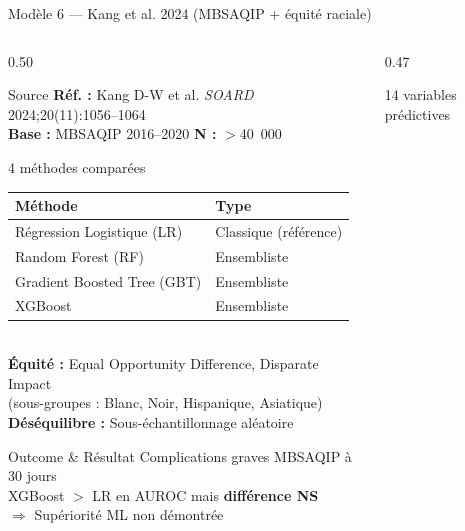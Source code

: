 \documentclass[aspectratio=169]{beamer}
\begin{document}
\begin{frame}[shrink=5]{Modèle 6 --- Kang et al. 2024 (MBSAQIP + équité raciale)}
  \begin{columns}[T]
    \begin{column}{0.50\textwidth}
      \begin{block}{Source}
        \footnotesize
        \textbf{Réf. :} Kang D-W et al. \textit{SOARD} 2024;20(11):1056--1064\\
        \textbf{Base :} MBSAQIP 2016--2020 \quad \textbf{N :} $>$40~000
      \end{block}
      \vspace{0.15em}
      \begin{block}{4 méthodes comparées}
        \footnotesize
        \begin{tabular}{ll}
          \toprule
          \textbf{Méthode} & \textbf{Type} \\
          \midrule
          Régression Logistique (LR) & Classique (référence) \\
          Random Forest (RF) & Ensembliste \\
          Gradient Boosted Tree (GBT) & Ensembliste \\
          XGBoost & Ensembliste \\
          \bottomrule
        \end{tabular}
        \vspace{3pt}\\
        \textbf{Équité :} Equal Opportunity Difference, Disparate Impact\\
        (sous-groupes : Blanc, Noir, Hispanique, Asiatique)\\
        \textbf{Déséquilibre :} Sous-échantillonnage aléatoire
      \end{block}
      \vspace{0.15em}
      \begin{block}{Outcome \& Résultat}
        \footnotesize
        Complications graves MBSAQIP à 30 jours\\
        XGBoost $>$ LR en AUROC mais \textbf{différence NS}\\
        $\Rightarrow$ Supériorité ML non démontrée
      \end{block}
    \end{column}
    \begin{column}{0.47\textwidth}
      \begin{block}{14 variables prédictives}
        \footnotesize

\end{block}
\end{column}
\end{columns}
\end{frame}
\end{document}
